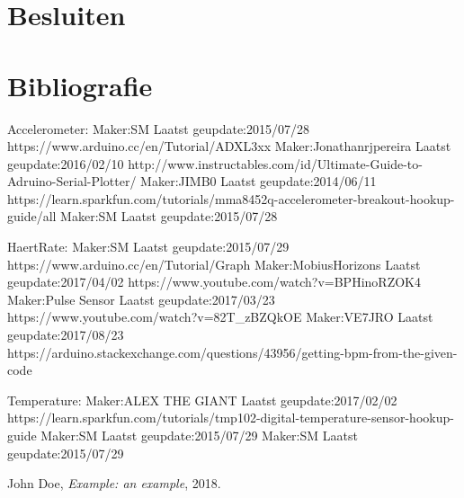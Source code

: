 \documentclass[a4paper]{report}
\begin{document}
\chapter{Besluiten}

\chapter{Bibliografie}
Accelerometer:
Maker:SM                  Laatst geupdate:2015/07/28      https://www.arduino.cc/en/Tutorial/ADXL3xx
Maker:Jonathanrjpereira   Laatst geupdate:2016/02/10      http://www.instructables.com/id/Ultimate-Guide-to-Adruino-Serial-Plotter/
Maker:JIMB0               Laatst geupdate:2014/06/11      https://learn.sparkfun.com/tutorials/mma8452q-accelerometer-breakout-hookup-guide/all
Maker:SM                  Laatst geupdate:2015/07/28




HaertRate:
Maker:SM                  Laatst geupdate:2015/07/29      https://www.arduino.cc/en/Tutorial/Graph
Maker:MobiusHorizons      Laatst geupdate:2017/04/02      https://www.youtube.com/watch?v=BPHinoRZOK4
Maker:Pulse Sensor        Laatst geupdate:2017/03/23      https://www.youtube.com/watch?v=82T_zBZQkOE
Maker:VE7JRO              Laatst geupdate:2017/08/23      https://arduino.stackexchange.com/questions/43956/getting-bpm-from-the-given-code

Temperature:
Maker:ALEX THE GIANT      Laatst geupdate:2017/02/02      https://learn.sparkfun.com/tutorials/tmp102-digital-temperature-sensor-hookup-guide
Maker:SM                  Laatst geupdate:2015/07/29
Maker:SM                  Laatst geupdate:2015/07/29




\begin{thebibliography}{9}

  John Doe,
  \textit{Example: an example},
  2018.

\end{thebibliography}
\end{document}
